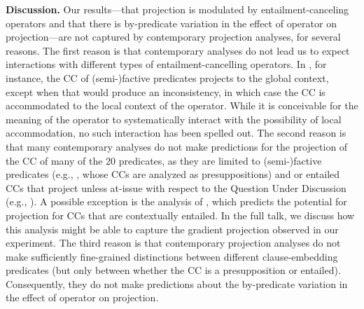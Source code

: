 \documentclass[12pt, a4paper]{article}
\begin{document}
{\bf Discussion.}
	Our results---that projection is modulated by entailment-canceling operators and that there is by-predicate variation in the effect of operator on projection---are not captured by contemporary projection analyses, for several reasons.
	The first reason is that contemporary analyses do not lead us to expect interactions with different types of entailment-cancelling operators. In \citealt{heim_projection_1983}, for instance, the CC of (semi-)factive predicates projects to the global context, except when that would produce an inconsistency, in which case the CC is accommodated to the local context of the operator. While it is conceivable for the meaning of the operator to systematically interact with the possibility of local accommodation, no such interaction has been spelled out.
	The second reason is that many contemporary analyses do not make predictions for the projection of the CC of many of the 20 predicates, as they are limited to (semi-)factive predicates (e.g., \citealt{heim_projection_1983,van_der_sandt_presupposition_1992}, whose CCs are analyzed as presuppositions) and or entailed CCs that project unless at-issue with respect to the Question Under Discussion (e.g., \citealt{abrusan_predicting_2011,simons_best_2017}). A possible exception is the analysis of \citealt{schlenker_triggering_2021}, which predicts the potential for projection for CCs that are contextually entailed. In the full talk, we discuss how this analysis might be able to capture the gradient projection observed in our experiment.
	The third reason is that contemporary projection analyses do not make sufficiently fine-grained distinctions between different clause-embedding predicates (but only between whether the CC is a presupposition or entailed). Consequently, they do not make predictions about the by-predicate variation in the effect of operator on projection.
\end{document}
